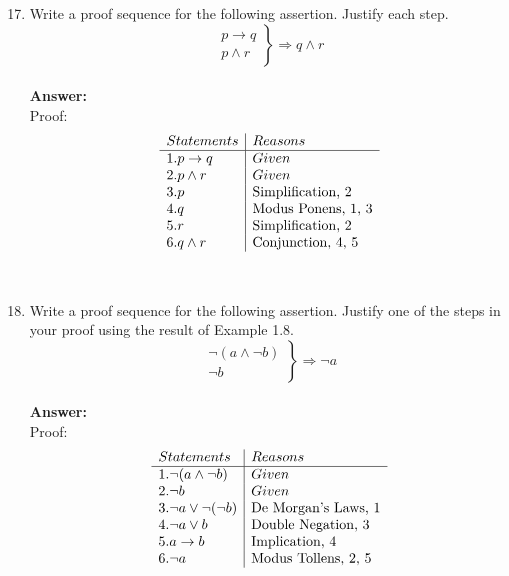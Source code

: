 \documentclass[12pt]{article}
\begin{document}
\newpage
\begin{enumerate}
\setcounter{enumi}{16}
\item Write a proof sequence for the following assertion. Justify each step.
\[ \left. \begin{array}{r}
      p \rightarrow q \\
    p \wedge r \end{array} \right\} \Longrightarrow q \wedge r \] \\ 
\textbf{Answer: } \\ Proof: 
\begin{displaymath}
  \begin{array}{l|l c|c|c|c|c|}
  Statements & Reasons \\%
  \hline %
  1. p \rightarrow q & Given \\
  2. p \wedge r & Given \\
  3. p & \text{Simplification, 2} \\
  4. q & \text{Modus Ponens, 1, 3} \\
  5. r & \text{Simplification, 2} \\
  6. q \wedge r & \text{Conjunction, 4, 5} \\
  \end{array}
\end{displaymath}

~\\

\item 
Write a proof sequence for the following assertion. Justify one of the steps in your proof using the result of Example 1.8.
\[ \left. \begin{array}{r}
      \neg (a \wedge \neg b) \\
      \neg b \end{array} \right\} \Longrightarrow \neg a \] \\ 
\textbf{Answer: } \\ Proof: 
      \begin{displaymath}
        \begin{array}{l|l c|c|c|c|c|}
        Statements & Reasons \\%
        \hline %
        1. \neg(a \wedge \neg b) & Given \\
        2. \neg b & Given \\
        3. \neg a \vee \neg (\neg b) & \text{De Morgan's Laws, 1} \\
        4. \neg a \vee b & \text{Double Negation, 3} \\
        5. a \rightarrow b & \text{Implication, 4} \\
        6. \neg a & \text{Modus Tollens, 2, 5} \\
        \end{array}
      \end{displaymath}
\end{enumerate}
\end{document}
